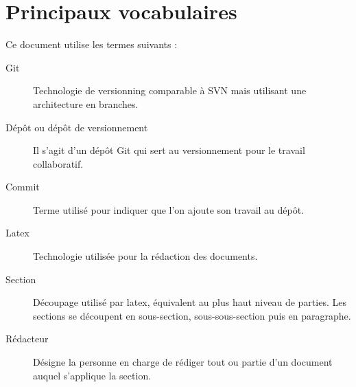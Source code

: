 \section{Principaux vocabulaires}

Ce document utilise les termes suivants :
\begin{description}
\item[Git] Technologie de versionning comparable à SVN mais utilisant une
architecture en branches.
\item[Dépôt ou dépôt de versionnement] Il s'agit d'un dépôt Git qui sert
au versionnement pour le travail collaboratif.
\item[Commit] Terme utilisé pour indiquer que l'on ajoute son travail
au dépôt.
\item[Latex] Technologie utilisée pour la rédaction des documents.
\item[Section] Découpage utilisé par latex, équivalent au plus haut niveau
de parties. Les sections se découpent en sous-section, sous-sous-section puis
en paragraphe.
\item[Rédacteur] Désigne la personne en charge de rédiger tout ou partie
d'un document auquel s'applique la section.
\end{description}

